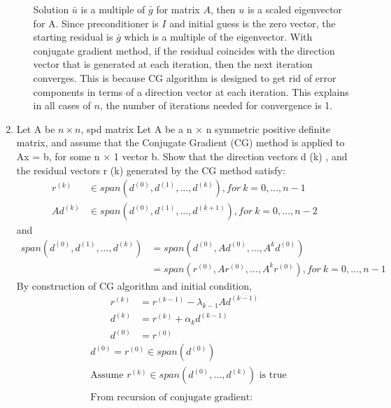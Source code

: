 \documentclass[12pt,letter]{article}
\begin{document}
\begin{enumerate}
\begin{enumerate}
    Solution $\bar{u}$ is a multiple of $\bar{g}$ for matrix $A$, then $u$ is a scaled eigenvector for A. Since preconditioner is $I$ and initial guess is the zero vector, the starting residual is $\bar{g}$ which is a multiple of the eigenvector. With conjugate gradient method, if the residual coincides with the direction vector that is generated at each iteration, then the next iteration converges. This is because CG algorithm is designed to get rid of error components in terms of a direction vector at each iteration. This explains in all cases of $n$, the number of iterations needed for convergence is 1.\\
    
  \end{enumerate}

  \pagebreak
  
\item Let A be $n \times n$, spd matrix
  Let A be a n $\times$ n symmetric positive definite matrix, and assume that the Conjugate Gradient (CG) method is applied to Ax = b, for some n × 1 vector b. Show that the direction vectors d (k) , and the residual vectors r (k) generated by the CG method satisfy:
  \begin{align*}
    r^{(k)} & \in span(d^{(0)} , d^{(1)} , . . . , d^{(k)} ), for\ k = 0, . . . , n − 1\\
    Ad^{(k)} & \in span(d^{(0)} , d^{(1)} , . . . , d^{(k+1)} ), for\ k = 0, . . . , n − 2
  \end{align*}
  and
  \begin{align*}
    span(d^{(0)} , d^{(1)} , . . . , d^{(k)} ) &= span(d^{(0)} , Ad^{(0)} , . . . , A^k d^{(0)} )\\
    &= span(r^{(0)} , Ar^{(0)} , . . . , A^k r^{(0)} ), for\ k = 0, . . . , n − 1
  \end{align*}
  By construction of CG algorithm and initial condition,
  \begin{align*}
    r^{(k)} &= r^{(k-1)}-\lambda_{k-1}Ad^{(k-1)}\\
    d^{(k)} &= r^{(k)}+\alpha_k d^{(k-1)}\\
    d^{(0)} &= r^{(0)}
  \end{align*}
  \begin{align*}
    &d^{(0)} = r^{(0)} \in span(d^{(0)})\\
    &\text{Assume } r^{(k)} \in span(d^{(0)}, ..., d^{(k)}) \text{ is true}\\
    \\
    &\text{From recursion of conjugate gradient:}\\

\end{align*}
\end{enumerate}
\end{document}
